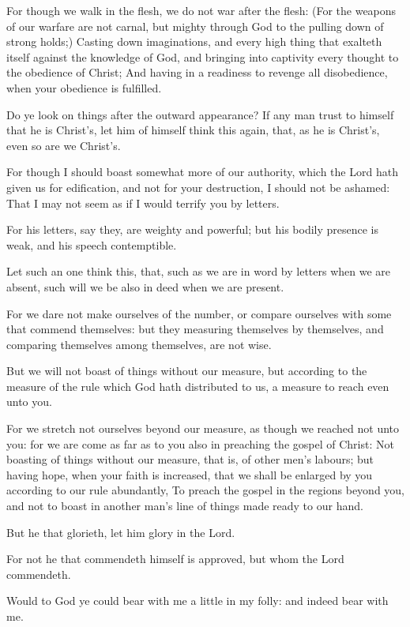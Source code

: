\Verse For though we walk in the flesh, we do not war after the flesh: \Verse (For the weapons of our warfare are not carnal, but mighty through God to the pulling down of strong holds;) \Verse Casting down imaginations, and every high thing that exalteth itself against the knowledge of God, and bringing into captivity every thought to the obedience of Christ; \Verse And having in a readiness to revenge all disobedience, when your obedience is fulfilled.

\Verse Do ye look on things after the outward appearance? If any man trust to himself that he is Christ's, let him of himself think this again, that, as he is Christ's, even so are we Christ's.

\Verse For though I should boast somewhat more of our authority, which the Lord hath given us for edification, and not for your destruction, I should not be ashamed: \Verse That I may not seem as if I would terrify you by letters.

\Verse For his letters, say they, are weighty and powerful; but his bodily presence is weak, and his speech contemptible.

\Verse Let such an one think this, that, such as we are in word by letters when we are absent, such will we be also in deed when we are present.

\Verse For we dare not make ourselves of the number, or compare ourselves with some that commend themselves: but they measuring themselves by themselves, and comparing themselves among themselves, are not wise.

\Verse But we will not boast of things without our measure, but according to the measure of the rule which God hath distributed to us, a measure to reach even unto you.

\Verse For we stretch not ourselves beyond our measure, as though we reached not unto you: for we are come as far as to you also in preaching the gospel of Christ: \Verse Not boasting of things without our measure, that is, of other men's labours; but having hope, when your faith is increased, that we shall be enlarged by you according to our rule abundantly, \Verse To preach the gospel in the regions beyond you, and not to boast in another man's line of things made ready to our hand.

\Verse But he that glorieth, let him glory in the Lord.

\Verse For not he that commendeth himself is approved, but whom the Lord commendeth.


\Chapter
\Verse Would to God ye could bear with me a little in my folly: and indeed bear with me.


